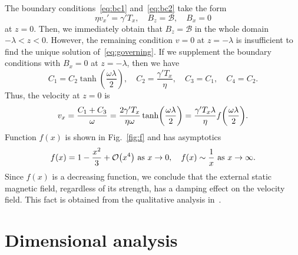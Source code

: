\documentclass{article}
\begin{document}
The boundary conditions~\eqref{eq:bc1} and~\eqref{eq:bc2} take the form
\begin{equation}\label{eq:bc}
    \eta v_x' = \gamma' T_x, \quad B_z = \mathcal{B}, \quad B_x = 0
\end{equation}
at $z=0$.
Then, we immediately obtain that $B_z=\mathcal{B}$ in the whole domain $-\lambda<z<0$.
However, the remaining condition $v=0$ at $z=-\lambda$ is insufficient to find the unique solution of~\eqref{eq:governing}.
If we supplement the boundary conditions with $B_x = 0$ at $z=-\lambda$, then we have
\begin{equation}\label{eq:constants}
    C_1 = C_2\tanh(\frac{\omega\lambda}2), \quad
    C_2 = \frac{\gamma'T_x}{\eta}, \quad
    C_3 = C_1, \quad C_4 = C_2.
\end{equation}
Thus, the velocity at $z=0$ is
\begin{equation}\label{eq:velocity}
    v_x = \frac{C_1+C_3}{\omega}
        = \frac{2\gamma'T_x}{\eta\omega}\tanh(\frac{\omega\lambda}2)
        = \frac{\gamma'T_x\lambda}{\eta} f\qty(\frac{\omega\lambda}2).
\end{equation}
Function $f(x)$ is shown in Fig.~\ref{fig:f} and has asymptotics
\begin{equation}\label{eq:f_asym}
    f(x) = 1 - \frac{x^2}{3} + \order{x^4} \text{ as } x\to0, \quad
    f(x) \sim \frac1x \text{ as } x\to\infty.
\end{equation}
Since $f(x)$ is a decreasing function,
we conclude that the external static magnetic field, regardless of its strength, has a damping effect on the velocity field.
This fact is obtained from the qualitative analysis in~\cite{du2019influence}.

\section{Dimensional analysis}
\end{document}
